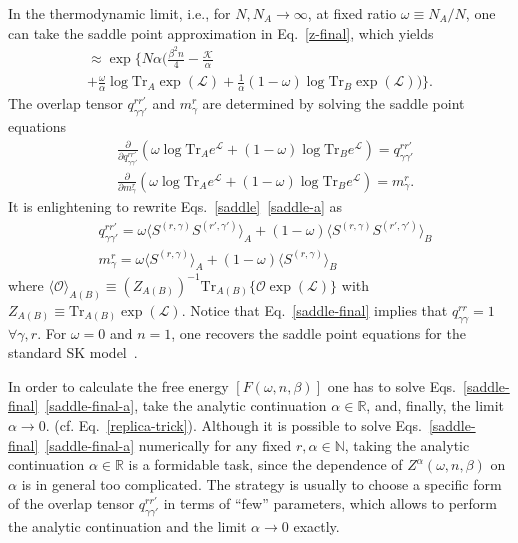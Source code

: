 \documentclass[twocolumn,superscriptaddress,prb,10pt]{revtex4-1}
\def\tr{\textrm{Tr}}
\begin{document}
In the thermodynamic limit, i.e., for $N,N_A\to\infty$, at fixed ratio 
$\omega\equiv N_A/N$, one can take the saddle point approximation in 
Eq.~\eqref{z-final}, which yields   
%
\begin{multline}
[Z^\alpha(\omega,n,\beta)]\approx
\exp\Big\{N\alpha\Big(\frac{\beta^2n}{4}-\frac{\mathcal K}{\alpha}\\
+\frac{\omega}{\alpha}\log\tr_A\exp({\mathcal L})+
\frac{1}{\alpha}(1-\omega)\log\tr_B\exp({\mathcal L})
\Big)\Big\}. 
\label{Z-ac}
\end{multline}
%
The overlap tensor $q_{\gamma\gamma'}^{rr'}$ and $m_\gamma^r$ are 
determined by solving the saddle point equations 
%
\begin{align}
\label{saddle}
& \frac{\partial}{\partial q_{\gamma\gamma'}^{rr'}}
\left(\omega\log\tr_A e^{{\mathcal L}}+(1-\omega)\log\tr_B 
e^{{\mathcal L}}\right)=q_{\gamma\gamma'}^{rr'}\\
\label{saddle-a}
& \frac{\partial}{\partial m_\gamma^r}\left(\omega\log\tr_A 
e^{{\mathcal L}}+(1-\omega)\log\tr_B e^{{\mathcal L}}\right)=
m_\gamma^r.
\end{align}
%
It is enlightening to rewrite Eqs.~\eqref{saddle}~\eqref{saddle-a} as 
%
\begin{align}
\label{saddle-final}
& q_{\gamma\gamma'}^{rr'}=
\omega\langle S^{(r,\gamma)} S^{(r',\gamma')}\rangle_A+
(1-\omega)\langle S^{(r,\gamma)}S^{(r',\gamma')}
\rangle_B\\
& m_\gamma^r=\omega\langle S^{(r,\gamma)}
\rangle_A+(1-\omega)\langle S^{(r,\gamma)}
\rangle_B
\label{saddle-final-a}
\end{align}
%
where $\langle {\mathcal O}\rangle_{A(B)}\equiv (Z_{A(B)})^{-1}
\tr_{A(B)}\{{\mathcal O}\exp({\mathcal L})\}$ with $Z_{A(B)}\equiv\tr_{A(B)}
\exp({\mathcal L})$. Notice that Eq.~\eqref{saddle-final} implies 
that $q_{\gamma\gamma}^{rr}=1$ $\forall\gamma,r$. For $\omega=0$ and $n=1$, 
one recovers the saddle point equations for the standard SK model~\cite{parisi-book,
nishimori-book}. 

In order to calculate the free energy $[F(\omega,n,\beta)]$ one has to solve 
Eqs.~\eqref{saddle-final}~\eqref{saddle-final-a}, take the analytic continuation 
$\alpha\in\mathbb{R}$, and, finally, the limit $\alpha\to 0$.  
(cf. Eq.~\eqref{replica-trick}). Although it is possible to solve 
Eqs.~\eqref{saddle-final}~\eqref{saddle-final-a} numerically for any fixed $r,
\alpha\in\mathbb{N}$, taking the analytic continuation $\alpha\in\mathbb{R}$ is a 
formidable task, since the dependence of $Z^\alpha(\omega,n,\beta)$ on $\alpha$ is in 
general too complicated. The strategy is usually to choose a specific 
form of the overlap tensor $q_{\gamma\gamma'}^{rr'}$ in terms of ``few'' 
parameters, which allows to perform the analytic continuation and the limit 
$\alpha\to 0$ exactly. 
\end{document}
